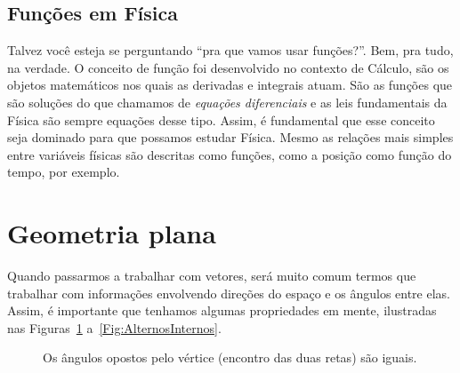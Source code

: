 \subsection{Funções em Física}

Talvez você esteja se perguntando ``pra que vamos usar funções?''. Bem, pra tudo, na verdade. O conceito de função foi desenvolvido no contexto de Cálculo, são os objetos matemáticos nos quais as derivadas e integrais atuam. São as funções que são soluções do que chamamos de \emph{equações diferenciais} e as leis fundamentais da Física são sempre equações desse tipo. Assim, é fundamental que esse conceito seja dominado para que possamos estudar Física. Mesmo as relações mais simples entre variáveis físicas são descritas como funções, como a posição como função do tempo, por exemplo.

\section{Geometria plana}

Quando passarmos a trabalhar com vetores, será muito comum termos que trabalhar com informações envolvendo direções do espaço e os ângulos entre elas. Assim, é importante que tenhamos algumas propriedades em mente, ilustradas nas Figuras~\ref{Fig:PropAngulosRetas1} a~\ref{Fig:AlternosInternos}.
\begin{figure}
\centering
{}
\caption{Os ângulos opostos pelo vértice (encontro das duas retas) são iguais. \label{Fig:PropAngulosRetas1}}
\end{figure}

